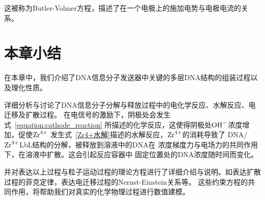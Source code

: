 这被称为Butler-Volmer方程，描述了在一个电极上的施加电势与电极电流的关系。

\section{本章小结}
在本章中，我们介绍了DNA信息分子发送器中关键的多层DNA结构的组装过程以及理化性质。

详细分析与讨论了DNA信息分子分解与释放过程中的电化学反应、水解反应、电迁移及扩散过程。
在电信号的激励下，阴极处会发生式~\ref{equation:cathode_reaction}
所描述的化学反应，这使得阴极处$\ce{OH-}$浓度增加，促使$\ce{Zr^4+}$
发生式~\ref{Zr4+水解}描述的水解反应，$\ce{Zr^4+}$的消耗导致了
DNA/$\ce{Zr^{4+}}$LbL结构的分解，被释放到溶液中的DNA在
浓度梯度力与电场力的共同作用下，在溶液中扩散。这会引起反应容器中
固定位置处的DNA浓度随时间而变化。

并对表达以上过程与粒子运动过程的理论方程进行了详细介绍与说明。如表达扩散过程的菲克定律，表达电迁移过程的Nernst-Einstein关系等。
这些约束方程的共同作用，将帮助我们对真实的化学物理过程进行数值建模。